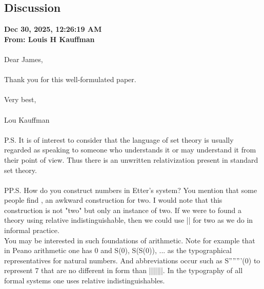 \documentclass{ws-rv9x6}
\theoremstyle{remark}
\begin{document}
\begin{appendices}
\section{Discussion}
\textbf{Dec 30, 2025, 12:26:19 AM \\
From: Louis H Kauffman \\}
\\
Dear James, \\
\\
Thank you for this well-formulated paper. \\
\\
Very best, \\ 
\\
Lou Kauffman \\
\\
P.S. It is of interest to consider that the language of set theory is
usually regarded as speaking to someone who understands it or may
understand it from their point of view. Thus there is an unwritten
relativization present in standard set theory. \\
\\
PP.S. How do you construct numbers in Etter's system? You mention that
some people find {{},{{}}} an awkward construction for two. I would
note that this construction is
not "two" but only an instance of two. If we were to found a theory
using relative indistinguishable, then we could use || for two as we
do in informal practice. \\
You may be interested in such foundations of arithmetic. Note for
example that in Peano arithmetic one has 0 and S(0), S(S(0)), ... as
the typographical representatives for natural numbers. And
abbreviations occur such as S'''''''(0) to represent 7 that are no
different in form than |||||||. In the typography of all formal
systems one uses relative indistinguishables. \\



\end{appendices}
\end{document}
